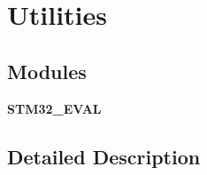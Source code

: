 \section{Utilities}
\label{group___utilities}
\subsection*{Modules}
\begin{DoxyCompactItemize}
\item 
\textbf{ S\+T\+M32\+\_\+\+E\+V\+AL}
\end{DoxyCompactItemize}


\subsection{Detailed Description}
